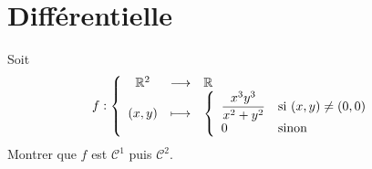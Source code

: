 \documentclass{fancybook}
\begin{document}
\pagestyle{exercice}
\section{Différentielle}

\begin{exercice}
Soit 
\[
f : \left\{
	\begin{array}{c c l}
		\mathbb{R}^2 & \longrightarrow & \mathbb{R} \\
		(x,y) &\longmapsto & \left\{
		\begin{array}{l l}
			\dfrac{x^3y^3}{x^2+y^2} & \text{si } (x,y)\neq (0,0) \\
			0 & \text{sinon}
		\end{array}\right.
	\end{array}	
\right.
\]
Montrer que $f$ est $\mathscr{C}^1$ puis $\mathscr{C}^2$.
\end{exercice}
\end{document}
